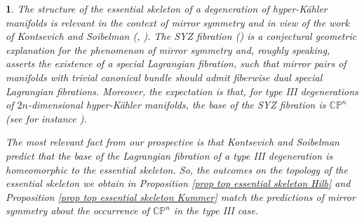 \documentclass{amsart}%
\numberwithin{equation}{subsection}
\theoremstyle{plain2}
\theoremstyle{definition2}
\theoremstyle{stepstyle}
\theoremstyle{point}
\theoremstyle{subpoint}
\newtheorem{subpoint}[equation]{}%
\newcommand{\spa}[1]{\begin{subpoint}#1\end{subpoint}}           %
\newcommand{\CP}{\ensuremath{\mathbb{CP}}}
\begin{document}
\spa{The structure of the essential skeleton of a degeneration of hyper-K\"{a}hler manifolds is relevant in the context of mirror symmetry and in view of the work of Kontsevich and Soibelman (\cite{KontsevichSoibelmana}, \cite{KontsevichSoibelman}). The SYZ fibration (\cite{StromingerYauZaslow}) is a conjectural geometric explanation for the phenomenon of mirror symmetry and, roughly speaking, asserts the existence of a special Lagrangian fibration, such that mirror pairs of manifolds with trivial canonical bundle should admit fiberwise dual special Lagrangian fibrations. Moreover, the expectation is that, for type III degenerations of $2n$-dimensional hyper-K\"{a}hler manifolds, the base of the SYZ fibration is $\CP^n$ (see for instance \cite{Hwang}).

The most relevant fact from our prospective is that Kontsevich and Soibelman predict that the base of the Lagrangian fibration of a type III degeneration is homeomorphic to the essential skeleton. So, the outcomes on the topology of the essential skeleton we obtain in Proposition \ref{prop top essential skeleton Hilb} and Proposition \ref{prop top essential skeleton Kummer} match the predictions of mirror symmetry about the occurrence of $\CP^n$ in the type III case. 
}
\printbibliography 
\end{document}
